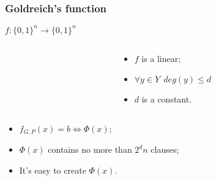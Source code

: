 \begin{frame}
	\frametitle{Goldreich's function}
	$f:\{0, 1\}^n \rightarrow \{0, 1\}^n$

    \pause

    \begin{columns}
    	\begin{column}{5.5cm}
            
        \end{column}

        \pause
        \pause
        \begin{column}{5.5cm}
            \begin{itemize}
	            \item $f$ is a linear;
            	\pause
                \item $\forall y \in Y ~~ deg(y) \le d$
            	\pause
            	\item $d$ is a constant.
            \end{itemize}
        \end{column}
	\end{columns}
    
	\pause
    \begin{itemize}
	    \item $f_{G, P}(x) = b \Leftrightarrow \Phi(x)$;
    	\pause
	    \item $\Phi(x)$ contains no more than $2^dn$ clauses;
    	\pause
    	\item It's easy to create $\Phi(x)$.
    \end{itemize}
\end{frame}

